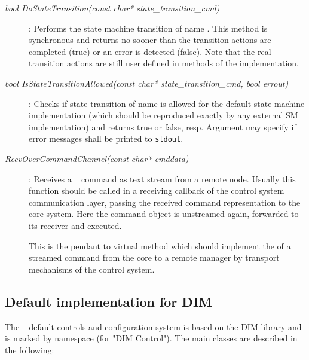 \begin{description}

 
\item[\em bool DoStateTransition(const char* state\_transition\_cmd)] :
Performs the state machine transition of name .
This method is synchronous and returns no sooner than the 
transition actions are completed (true) or an error is detected (false).
Note that the real transition actions are still user defined in methods
of the  implementation.

\item[\em bool IsStateTransitionAllowed(const char* state\_transition\_cmd, bool errout)] :
Checks if state transition of name  is allowed
for the default state machine implementation (which should be reproduced exactly by
any external SM implementation) and returns true or false, resp. Argument
 may specify if error messages shall be printed to {\tt stdout}.

\item[\em RecvOverCommandChannel(const char* cmddata)] :
Receives a \dabc~ command as text stream  
from a remote node. Usually this function should be called in a
receiving callback of the control system communication layer,
passing the received command representation to the core system.
Here the command object is unstreamed again, forwarded to its
receiver and executed.

This is the pendant to virtual method 
 which should implement the  
of a streamed command from the core to a remote manager by transport mechanisms of the control system. 

 
 
\end{description}






\subsection{Default implementation for DIM}
\label{prog_manager_controls_DIM}
The \dabc~ default controls and configuration system 
is based on the DIM library \cite{DIM} and is marked by namespace
 (for "DIM Control"). 
The main classes are described in the following:

